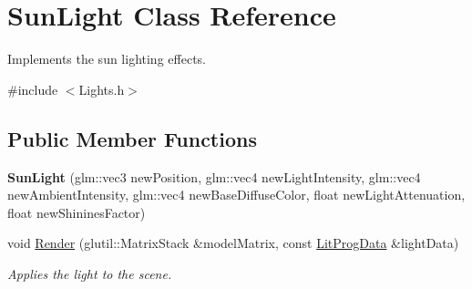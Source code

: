 \hypertarget{class_sun_light}{\section{Sun\-Light Class Reference}
\label{class_sun_light}
}


Implements the sun lighting effects.  




{\ttfamily \#include $<$Lights.\-h$>$}

\subsection*{Public Member Functions}
\begin{DoxyCompactItemize}
\item 
\hypertarget{class_sun_light_a60324f930a5714b244e796ad4d7dcb2e}{{\bfseries Sun\-Light} (glm\-::vec3 new\-Position, glm\-::vec4 new\-Light\-Intensity, glm\-::vec4 new\-Ambient\-Intensity, glm\-::vec4 new\-Base\-Diffuse\-Color, float new\-Light\-Attenuation, float new\-Shinines\-Factor)}\label{class_sun_light_a60324f930a5714b244e796ad4d7dcb2e}

\item 
\hypertarget{class_sun_light_ade6fbab75e4d018d94e5aba20361b4cc}{void \hyperlink{class_sun_light_ade6fbab75e4d018d94e5aba20361b4cc}{Render} (glutil\-::\-Matrix\-Stack \&model\-Matrix, const \hyperlink{struct_lit_prog_data}{Lit\-Prog\-Data} \&light\-Data)}\label{class_sun_light_ade6fbab75e4d018d94e5aba20361b4cc}

\begin{DoxyCompactList}\small\item\em Applies the light to the scene. \end{DoxyCompactList}\end{DoxyCompactItemize}
